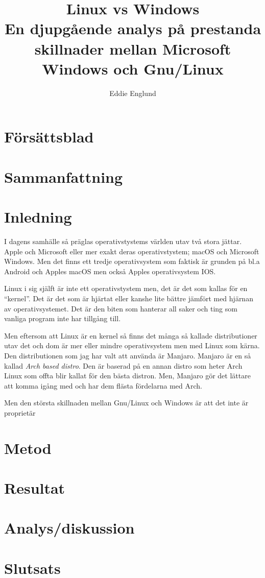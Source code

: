 \documentclass[a4paper, 12pt, twoside]{article}
\author{Eddie Englund}
\title{Linux vs Windows\\[0.2em]\smaller{}En djupgående analys på prestanda skillnader mellan Microsoft Windows och Gnu/Linux}
\begin{document}
\maketitle


\tableofcontents

\section{Försättsblad}\label{flyleaf}


\section{Sammanfattning}\label{sum}

    \begin{abstract}

    \end{abstract}

\section{Inledning}


    I dagens samhälle så präglas operativstystems världen utav två stora jättar. Apple och Microsoft eller mer exakt deras operativstystem; macOS och Microsoft Windows. Men det finns ett tredje operativsystem som faktisk är grunden på bl.a Android och Apples macOS men också Apples operativsystem IOS.

    Linux i sig själft är inte ett operativstystem men, det är det som kallas för en ``kernel''. Det är det som är hjärtat eller kanshe lite bättre jämfört med hjärnan av operativsystemet. Det är den biten som hanterar all saker och ting som vanliga program inte har tillgång till.

    Men eftersom att Linux är en kernel så finns det många så kallade distributioner utav det och dom är mer eller mindre operativsystem men med Linux som kärna. Den distributionen som jag har valt att använda är Manjaro. Manjaro är en så kallad \textit{Arch based distro}. Den är baserad på en annan distro som heter Arch Linux som offta blir kallat för den bästa distron. Men, Manjaro gör det lättare att komma igång med och har dem flästa fördelarna med Arch.

    Men den största skillnaden mellan Gnu/Linux och Windows är att det inte är proprietär
    

\section{Metod}

\section{Resultat}

\section{Analys/diskussion}

\section{Slutsats}
\end{document}
